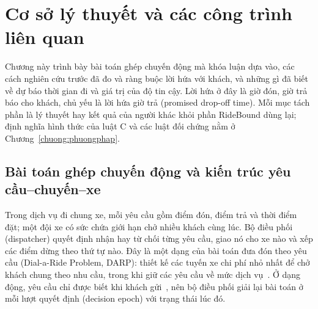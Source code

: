 
\chapter{Cơ sở lý thuyết và các công trình liên quan}
\label{chuong:coso}

Chương này trình bày bài toán ghép chuyến động mà khóa luận dựa vào, các cách nghiên cứu trước đã đo và ràng buộc
lời hứa với khách, và những gì đã biết về dự báo thời gian đi và giá trị của độ tin cậy. Lời hứa ở đây là giờ đón,
giờ trả báo cho khách, chủ yếu là lời hứa giờ trả (promised drop-off time). Mỗi mục tách phần là lý thuyết hay kết
quả của người khác khỏi phần RideBound dùng lại; định nghĩa hình thức của luật C và các luật đối chứng nằm ở
Chương~\ref{chuong:phuongphap}.

\section{Bài toán ghép chuyến động và kiến trúc yêu cầu--chuyến--xe}
\label{muc:c2-baitoan}

Trong dịch vụ đi chung xe, mỗi yêu cầu gồm điểm đón, điểm trả và thời điểm đặt; một đội xe có sức chứa giới hạn chở
nhiều khách cùng lúc. Bộ điều phối (dispatcher) quyết định nhận hay từ chối từng yêu cầu, giao nó cho xe nào và xếp
các điểm dừng theo thứ tự nào. Đây là một dạng của bài toán đưa đón theo yêu cầu (Dial-a-Ride Problem, DARP): thiết
kế các tuyến xe chi phí nhỏ nhất để chở khách chung theo nhu cầu, trong khi giữ các yêu cầu về mức dịch
vụ~\cite{molenbruch2017}. Ở dạng động, yêu cầu chỉ được biết khi khách gửi~\cite{schulz2026}, nên bộ điều phối giải
lại bài toán ở mỗi lượt quyết định (decision epoch) với trạng thái lúc đó.

